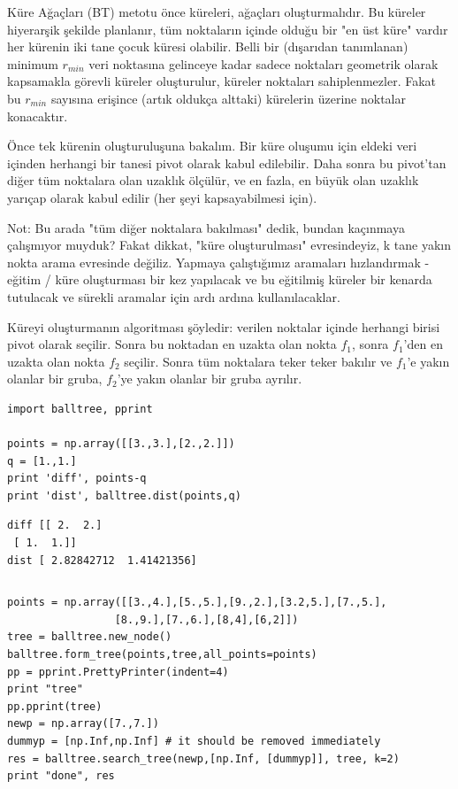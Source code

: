 \documentclass[12pt,fleqn]{article}\usepackage{../../common}
\begin{document}
Küre Ağaçları (BT) metotu önce küreleri, ağaçları oluşturmalıdır. Bu
küreler hiyerarşik şekilde planlanır, tüm noktaların içinde olduğu bir "en
üst küre" vardır her kürenin iki tane çocuk küresi olabilir. Belli bir
(dışarıdan tanımlanan) minimum $r_{min}$ veri noktasına gelinceye kadar
sadece noktaları geometrik olarak kapsamakla görevli küreler oluşturulur,
küreler noktaları sahiplenmezler. Fakat bu $r_{min}$ sayısına erişince
(artık oldukça alttaki) kürelerin üzerine noktalar konacaktır.

Önce tek kürenin oluşturuluşuna bakalım. Bir küre oluşumu için eldeki veri
içinden herhangi bir tanesi pivot olarak kabul edilebilir. Daha sonra bu
pivot'tan diğer tüm noktalara olan uzaklık ölçülür, ve en fazla, en büyük
olan uzaklık yarıçap olarak kabul edilir (her şeyi kapsayabilmesi için).

Not: Bu arada "tüm diğer noktalara bakılması" dedik, bundan kaçınmaya
çalışmıyor muyduk?  Fakat dikkat, "küre oluşturulması" evresindeyiz, k
tane yakın nokta arama evresinde değiliz. Yapmaya çalıştığımız aramaları
hızlandırmak - eğitim / küre oluşturması bir kez yapılacak ve bu eğitilmiş
küreler bir kenarda tutulacak ve sürekli aramalar için ardı ardına
kullanılacaklar.

Küreyi oluşturmanın algoritması şöyledir: verilen noktalar içinde herhangi
birisi pivot olarak seçilir. Sonra bu noktadan en uzakta olan nokta $f_1$,
sonra $f_1$'den en uzakta olan nokta $f_2$ seçilir. Sonra tüm noktalara
teker teker bakılır ve $f_1$'e yakın olanlar bir gruba, $f_2$'ye yakın
olanlar bir gruba ayrılır. 

\begin{verbatim}
import balltree, pprint

points = np.array([[3.,3.],[2.,2.]])
q = [1.,1.]
print 'diff', points-q
print 'dist', balltree.dist(points,q)
\end{verbatim}

\begin{verbatim}
diff [[ 2.  2.]
 [ 1.  1.]]
dist [ 2.82842712  1.41421356]
\end{verbatim}

\inputminted[fontsize=\footnotesize]{python}{balltree.py}

\begin{verbatim}
points = np.array([[3.,4.],[5.,5.],[9.,2.],[3.2,5.],[7.,5.],
                 [8.,9.],[7.,6.],[8,4],[6,2]])
tree = balltree.new_node()
balltree.form_tree(points,tree,all_points=points)
pp = pprint.PrettyPrinter(indent=4)
print "tree"
pp.pprint(tree)
newp = np.array([7.,7.])
dummyp = [np.Inf,np.Inf] # it should be removed immediately
res = balltree.search_tree(newp,[np.Inf, [dummyp]], tree, k=2)
print "done", res
\end{verbatim}
\end{document}
